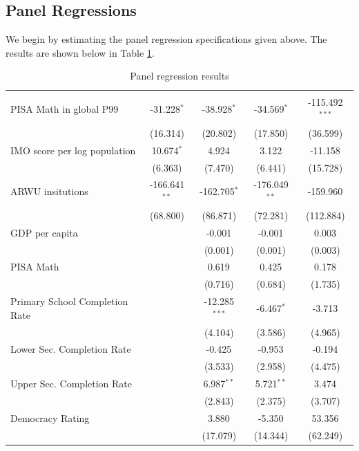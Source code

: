\documentclass[11pt]{article}
\begin{document}
\subsection{Panel Regressions}
We begin by estimating the panel regression specifications given above. The results are shown below in Table \ref{table:panel}.
\begin{table}[H] \centering
    \caption{Panel regression results}
    \label{table:panel}
    \resizebox{\linewidth}{!} {
        \begin{tabular}{@{\extracolsep{5pt}}lcccc}
            \\[-1.8ex]\hline
            \hline \\[-1.8ex]
            PISA Math in global P99 & -31.228$^{*}$ & -38.928$^{*}$ & -34.569$^{*}$ & -115.492$^{***}$ \\
            & (16.314) & (20.802) & (17.850) & (36.599) \\
            IMO score per log population & 10.674$^{*}$ & 4.924$^{}$ & 3.122$^{}$ & -11.158$^{}$ \\
            & (6.363) & (7.470) & (6.441) & (15.728) \\
            ARWU insitutions & -166.641$^{**}$ & -162.705$^{*}$ & -176.049$^{**}$ & -159.960$^{}$ \\
            & (68.800) & (86.871) & (72.281) & (112.884) \\
            GDP per capita & & -0.001$^{}$ & -0.001$^{}$ & 0.003$^{}$ \\
            & & (0.001) & (0.001) & (0.003) \\
            PISA Math & & 0.619$^{}$ & 0.425$^{}$ & 0.178$^{}$ \\
            & & (0.716) & (0.684) & (1.735) \\
            Primary School Completion Rate & & -12.285$^{***}$ & -6.467$^{*}$ & -3.713$^{}$ \\
            & & (4.104) & (3.586) & (4.965) \\
            Lower Sec. Completion Rate & & -0.425$^{}$ & -0.953$^{}$ & -0.194$^{}$ \\
            & & (3.533) & (2.958) & (4.475) \\
            Upper Sec. Completion Rate & & 6.987$^{**}$ & 5.721$^{**}$ & 3.474$^{}$ \\
            & & (2.843) & (2.375) & (3.707) \\
            Democracy Rating & & 3.880$^{}$ & -5.350$^{}$ & 53.356$^{}$ \\
            & & (17.079) & (14.344) & (62.249) \\

\end{tabular}}
\end{table}
\end{document}
